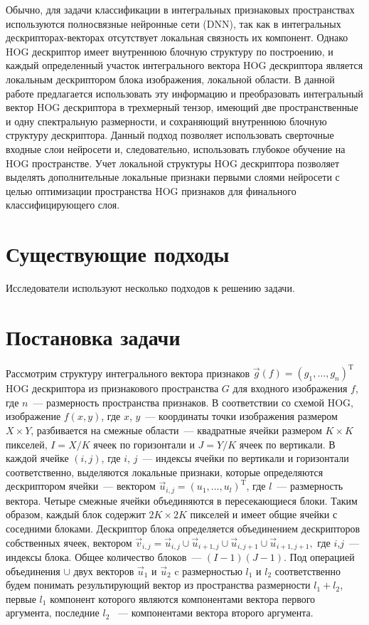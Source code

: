 \documentclass[12pt,twoside]{article}
\begin{document}
Обычно, для задачи классификации в интегральных признаковых пространствах используются полносвязные нейронные сети (DNN), так как в интегральных дескрипторах-векторах отсутствует локальная связность их компонент. Однако HOG дескриптор имеет внутреннюю блочную структуру по построению, и каждый определенный участок интегрального вектора HOG дескриптора является локальным дескриптором блока изображения, локальной области. В данной работе предлагается использовать эту информацию и преобразовать интегральный вектор HOG дескриптора в трехмерный тензор, имеющий две пространственные и одну спектральную размерности, и сохраняющий внутреннюю блочную структуру дескриптора. Данный подход позволяет использовать сверточные входные слои нейросети и, следовательно, использовать глубокое обучение на HOG пространстве. Учет локальной структуры HOG дескриптора позволяет выделять дополнительные локальные признаки первыми слоями нейросети с целью оптимизации пространства HOG признаков для финального классифицирующего слоя.

\section{Существующие подходы}
Исследователи используют несколько подходов к решению задачи. 

\section{Постановка задачи}
Рассмотрим структуру интегрального вектора признаков $\vec{g}(f) = (g_{1},\dots , g_{n})^{\mathrm{T}}$ HOG дескриптора \cite{dalaltriggs2005} из признакового пространства $G$ для входного изображения $f$, где $n$~--- размерность пространства признаков. В соответствии со схемой
HOG, изображение $f(x,y)$, где $x$, $y$~--– координаты точки изображения размером $X\times Y$, разбивается на смежные области~--– квадратные ячейки размером $K\times K$ пикселей, $I=X/K$ ячеек по горизонтали и $J=Y/K$ ячеек по вертикали. 
В каждой ячейке $(i,j)$, где $i$, $j$~--- индексы ячейки по вертикали 	и горизонтали соответственно, выделяются локальные признаки, которые определяются дескриптором ячейки~--- вектором $\vec{u}_{i,j} = (u_1, \dots , u_l)^{\mathrm{T}}$, где $l$~---	размерность вектора. Четыре смежные ячейки объединяются в пересекающиеся блоки. Таким образом, каждый блок содержит $2K \times 2K$ пикселей и имеет общие ячейки с соседними блоками. Дескриптор блока определяется объединением дескрипторов собственных ячеек, вектором $\vec{v}_{i,j} = \vec{u}_{i,j}\cup\vec{u}_{i+1,j}\cup\vec{u}_{i,j+1}
	\cup\vec{u}_{i+1,j+1},$ где $i$,$j$~--- индексы блока.
	Общее количество блоков~--- $(I-1)(J-1)$. Под операцией
	объединения $\cup$ двух векторов $\vec{u}_{1}$ и $\vec{u}_{2}$
	c размерностью $l_{1}$ и $l_{2}$ соответственно будем понимать результирующий вектор из пространства размерности $l_{1}+l_{2}$, первые $l_{1}$ компонент которого являются компонентами вектора первого аргумента, последние $l_{2}$ ~--- компонентами вектора второго аргумента.
	
\end{document}
